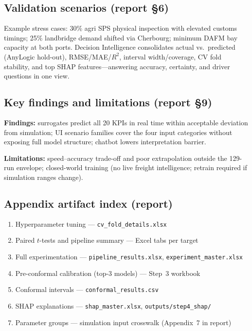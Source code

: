 \documentclass[12pt,twocolumn,a4paper]{article}
\theoremstyle{plain}
\theoremstyle{definition}
\theoremstyle{remark}
\begin{document}
\subsection{Validation scenarios (report \S6)}

Example stress cases: 30\% agri SPS physical inspection with elevated customs timings; 25\% landbridge demand shifted via Cherbourg; minimum DAFM bay capacity at both ports.
Decision Intelligence consolidates actual vs.\ predicted (AnyLogic hold-out), RMSE/MAE/$R^2$, interval width/coverage, CV fold stability, and top SHAP features---answering accuracy, certainty, and driver questions in one view.

\subsection{Key findings and limitations (report \S9)}

\textbf{Findings:} surrogates predict all 20 KPIs in real time within acceptable deviation from simulation; UI scenario families cover the four input categories without exposing full model structure; chatbot lowers interpretation barrier.

\textbf{Limitations:} speed--accuracy trade-off and poor extrapolation outside the 129-run envelope; closed-world training (no live freight intelligence; retrain required if simulation ranges change).

\subsection{Appendix artifact index (report)}

\begin{enumerate}
  \item Hyperparameter tuning --- \texttt{cv\_fold\_details.xlsx}
  \item Paired $t$-tests and pipeline summary --- Excel tabs per target
  \item Full experimentation --- \texttt{pipeline\_results.xlsx}, \texttt{experiment\_master.xlsx}
  \item Pre-conformal calibration (top-3 models) --- Step~3 workbook
  \item Conformal intervals --- \texttt{conformal\_results.csv}
  \item SHAP explanations --- \texttt{shap\_master.xlsx}, \texttt{outputs/step4\_shap/}
  \item Parameter groups --- simulation input crosswalk (Appendix~7 in report)
\end{enumerate}
\end{document}
